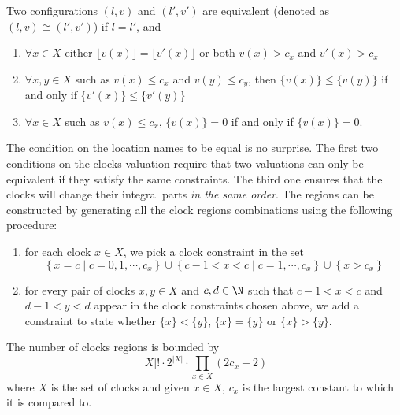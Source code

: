 \begin{definition} \cite{RADLD94,RA98}

Two configurations $(l, v)$ and $(l', v')$ are equivalent (denoted as $(l,v) \cong (l',v')$) if $l = l'$, and
\begin{enumerate}

  \item $\forall x \in X$ either $\lfloor v(x) \rfloor = \lfloor v'(x) \rfloor$ or both $v(x) > c_x$ and $v'(x) > c_x$

  \item $\forall x,y \in X$ such as $v(x) \leq c_x$ and $v(y) \leq c_y$, then $\{v(x)\} \leq \{v(y)\}$ if and only if $\{v'(x)\} \leq \{v'(y)\}$

  \item $\forall x \in X$ such as $v(x) \leq c_x$, $\{v(x)\} = 0$ if and only if $\{v(x)\} = 0$.

\end{enumerate}
\end{definition}

The condition on the location names to be equal is no surprise. The first two conditions on the clocks valuation require that two valuations can only be equivalent if they satisfy the same constraints. The third one ensures that the clocks will change their integral parts \emph{in the same order}.
%
The regions can be constructed by generating all the clock regions combinations using the following procedure:
\begin{enumerate}

	\item for each clock $x \in X$, we pick a clock constraint in the set
	$$   \left\{ x = c \;|\; c = 0, 1, \cdots, c_x \right\}
	\cup \left\{ c - 1 < x < c \;|\; c = 1, \cdots, c_x \right\}
	\cup \left\{ x > c_x \right\}
	$$

	\item for every pair of clocks $x, y \in X$ and $c, d \in \N$ such that $c - 1 < x < c$ and $d - 1 < y < d$ appear in the clock constraints chosen above, we add a constraint to state whether $\{x\} < \{y\}$, $\{x\} = \{y\}$ or $\{x\} > \{y\}$.

\end{enumerate}

\begin{lemma} \cite{RADLD94}
  
The number of clocks regions is bounded by
$$
|X|! \cdot 2^{|X|} \cdot \prod\limits_{x \in X}(2c_x + 2)
$$
where $X$ is the set of clocks and given $x \in X$, $c_x$ is the largest constant to which it is compared to.
\end{lemma}

